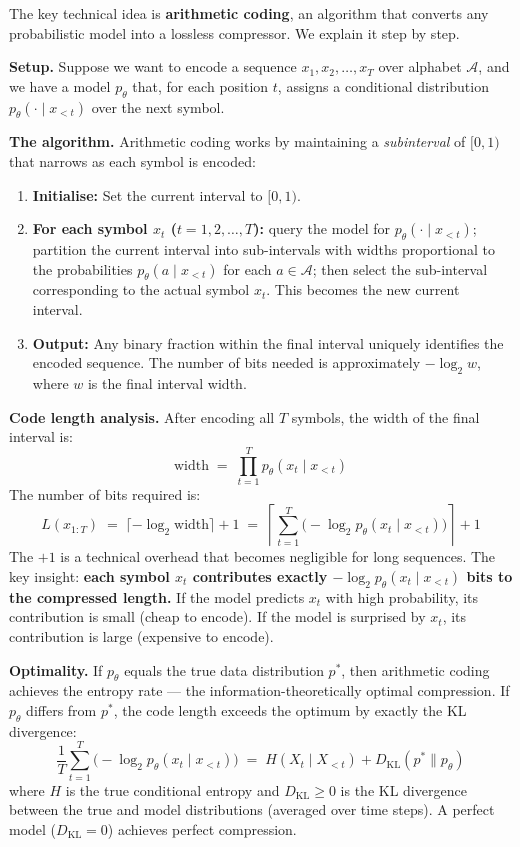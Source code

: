 \documentclass[11pt, a4paper]{article}
\begin{document}
The key technical idea is \textbf{arithmetic coding}, an algorithm that
converts any probabilistic model into a lossless compressor. We explain it
step by step.

\textbf{Setup.} Suppose we want to encode a sequence $x_1, x_2, \ldots,
x_T$ over alphabet $\mathcal{A}$, and we have a model
$p_\theta$ that, for each position $t$, assigns a conditional distribution
$p_\theta(\cdot \mid x_{<t})$ over the next symbol.

\textbf{The algorithm.} Arithmetic coding works by maintaining a
\emph{subinterval} of $[0, 1)$ that narrows as each symbol is encoded:
\begin{enumerate}[leftmargin=2em]
  \item \textbf{Initialise:} Set the current interval to $[0, 1)$.
  \item \textbf{For each symbol $x_t$ ($t = 1, 2, \ldots, T$):}
    query the model for $p_\theta(\cdot \mid x_{<t})$; partition the
    current interval into sub-intervals with widths proportional to the
    probabilities $p_\theta(a \mid x_{<t})$ for each $a \in \mathcal{A}$;
    then select the sub-interval corresponding to the actual symbol $x_t$.
    This becomes the new current interval.
  \item \textbf{Output:} Any binary fraction within the final interval
    uniquely identifies the encoded sequence. The number of bits needed
    is approximately $-\log_2 w$, where $w$ is the final interval width.
\end{enumerate}

\textbf{Code length analysis.} After encoding all $T$ symbols, the width
of the final interval is:
\[
\text{width} \;=\; \prod_{t=1}^{T} p_\theta(x_t \mid x_{<t})
\]
The number of bits required is:
\[
L(x_{1:T}) \;=\; \lceil -\log_2 \text{width} \rceil + 1
\;=\; \left\lceil \sum_{t=1}^{T} \bigl(-\log_2 p_\theta(x_t \mid
x_{<t})\bigr) \right\rceil + 1
\]
The $+1$ is a technical overhead that becomes negligible for long
sequences. The key insight: \textbf{each symbol $x_t$ contributes
exactly $-\log_2 p_\theta(x_t \mid x_{<t})$ bits to the compressed
length.} If the model predicts $x_t$ with high probability, its
contribution is small (cheap to encode). If the model is surprised by
$x_t$, its contribution is large (expensive to encode).

\textbf{Optimality.} If $p_\theta$ equals the true data distribution
$p^*$, then arithmetic coding achieves the entropy rate --- the
information-theoretically optimal compression. If $p_\theta$ differs from
$p^*$, the code length exceeds the optimum by exactly the
KL divergence:
\[
\frac{1}{T}\sum_{t=1}^{T}\bigl(-\log_2 p_\theta(x_t \mid x_{<t})\bigr)
\;=\; H(X_t \mid X_{<t}) + D_{\text{KL}}(p^* \| p_\theta)
\]
where $H$ is the true conditional entropy and $D_{\text{KL}} \geq 0$ is
the KL divergence between the true and model distributions (averaged over
time steps). A perfect model ($D_{\text{KL}} = 0$) achieves perfect
compression.
\end{document}
